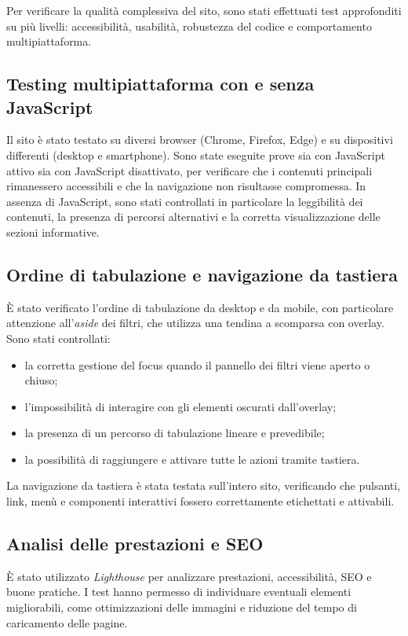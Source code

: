 \documentclass[a4paper,12pt]{article}
\begin{document}
Per verificare la qualità complessiva del sito, sono stati effettuati test approfonditi su più livelli: accessibilità, usabilità, robustezza del codice e comportamento multipiattaforma.

\subsection{Testing multipiattaforma con e senza JavaScript}
Il sito è stato testato su diversi browser (Chrome, Firefox, Edge) e su dispositivi differenti (desktop e smartphone). Sono state eseguite prove sia con JavaScript attivo sia con JavaScript disattivato, per verificare che i contenuti principali rimanessero accessibili e che la navigazione non risultasse compromessa. In assenza di JavaScript, sono stati controllati in particolare la leggibilità dei contenuti, la presenza di percorsi alternativi e la corretta visualizzazione delle sezioni informative.

\subsection{Ordine di tabulazione e navigazione da tastiera}
È stato verificato l’ordine di tabulazione da desktop e da mobile, con particolare attenzione all’\emph{aside} dei filtri, che utilizza una tendina a scomparsa con overlay. Sono stati controllati:
\begin{itemize}
    \item la corretta gestione del focus quando il pannello dei filtri viene aperto o chiuso;
    \item l’impossibilità di interagire con gli elementi oscurati dall’overlay;
    \item la presenza di un percorso di tabulazione lineare e prevedibile;
    \item la possibilità di raggiungere e attivare tutte le azioni tramite tastiera.
\end{itemize}
La navigazione da tastiera è stata testata sull’intero sito, verificando che pulsanti, link, menù e componenti interattivi fossero correttamente etichettati e attivabili.

\subsection{Analisi delle prestazioni e SEO}
È stato utilizzato \emph{Lighthouse} per analizzare prestazioni, accessibilità, SEO e buone pratiche. I test hanno permesso di individuare eventuali elementi migliorabili, come ottimizzazioni delle immagini e riduzione del tempo di caricamento delle pagine.
\end{document}
